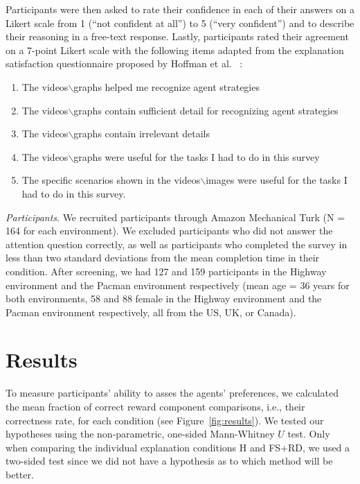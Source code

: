 \documentclass[runningheads]{llncs}
\begin{document}
Participants were then asked to rate their confidence in each of their answers on a Likert scale from 1 (``not confident at all'') to 5 (``very confident'') and to describe their reasoning in a free-text response.
Lastly, participants rated their agreement on a 7-point Likert scale with the following items adapted from the explanation satisfaction questionnaire proposed by Hoffman et al.~\cite{hoffman2018metrics}
:\begin{enumerate}
\item The videos$\backslash$graphs helped me recognize agent strategies
\item The videos$\backslash$graphs contain sufficient detail for recognizing agent strategies
\item The videos$\backslash$graphs contain irrelevant details 
\item The videos$\backslash$graphs were useful for the tasks I had to do in this survey
\item The specific scenarios shown in the videos$\backslash$images were useful for the tasks I had to do in this survey.
\end{enumerate}
\emph{Participants}. We recruited participants through Amazon Mechanical Turk (N = 164 for each environment). We excluded participants who did not answer the attention question correctly, as well as participants who completed the survey in less than two standard deviations from the mean completion time in their condition.
After screening, we had 127 and 159 participants in the Highway environment and the Pacman environment respectively (mean age = 36 years for both environments, 58 and 88 female in the Highway environment and the Pacman environment respectively,  all from the US, UK, or Canada).

\section{Results}
To measure participants' ability to asses the agents' preferences, we calculated the mean fraction of correct reward component comparisons, i.e., their correctness rate, for each condition (see Figure~\ref{fig:results}).
We tested our hypotheses using the non-parametric, one-sided Mann-Whitney $U$ test. Only when comparing the individual explanation conditions H and FS+RD, we used a two-sided test since we did not have a hypothesis as to which method will be better.
\end{document}
